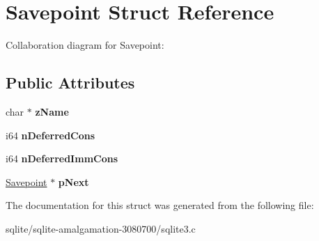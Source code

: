 \hypertarget{struct_savepoint}{\section{Savepoint Struct Reference}
\label{struct_savepoint}
}


Collaboration diagram for Savepoint\+:
\subsection*{Public Attributes}
\begin{DoxyCompactItemize}
\item 
\hypertarget{struct_savepoint_a0ba08ea77fcfd93099288375e2e9b1ec}{char $\ast$ {\bfseries z\+Name}}\label{struct_savepoint_a0ba08ea77fcfd93099288375e2e9b1ec}

\item 
\hypertarget{struct_savepoint_ae00dd8f725701d9e31da2edbb0b27435}{i64 {\bfseries n\+Deferred\+Cons}}\label{struct_savepoint_ae00dd8f725701d9e31da2edbb0b27435}

\item 
\hypertarget{struct_savepoint_a91b8cb5fac1bdf7d8f76ec30c82b862d}{i64 {\bfseries n\+Deferred\+Imm\+Cons}}\label{struct_savepoint_a91b8cb5fac1bdf7d8f76ec30c82b862d}

\item 
\hypertarget{struct_savepoint_a8d785c3c0eeb6f0c62ea5391892c78cb}{\hyperlink{struct_savepoint}{Savepoint} $\ast$ {\bfseries p\+Next}}\label{struct_savepoint_a8d785c3c0eeb6f0c62ea5391892c78cb}

\end{DoxyCompactItemize}


The documentation for this struct was generated from the following file\+:\begin{DoxyCompactItemize}
\item 
sqlite/sqlite-\/amalgamation-\/3080700/sqlite3.\+c\end{DoxyCompactItemize}
